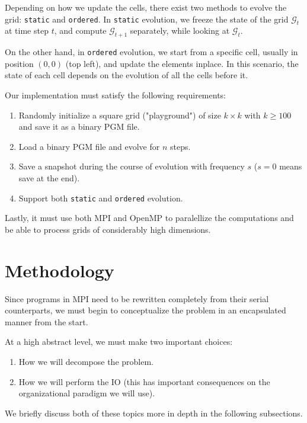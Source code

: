 \documentclass{report}
\begin{document}
Depending on how we update the cells, there exist two methods to evolve the 
grid: \texttt{static} and \texttt{ordered}. In \texttt{static} evolution, we 
freeze the state of the grid $\mathcal{G}_t$ at time step $t$, and compute 
$\mathcal{G}_{t+1}$ separately, while looking at $\mathcal{G}_t$.

On the other hand, in \texttt{ordered} evolution, we start from a specific cell, 
usually in position $(0,0)$ (top left), and update the elements in\-place. 
In this scenario, the state of each cell depends on the evolution of all the 
cells before it. 

Our implementation must satisfy the following requirements: 

\begin{enumerate}
    \item Randomly initialize a square grid ("playground") of size $k \times k$ 
        with $k \geq 100$ and save it as a binary PGM file.
    \item Load a binary PGM file and evolve for $n$ steps.
    \item Save a snapshot during the course of evolution with frequency $s$ ($s=0$ 
        means save at the end). 
    \item Support both \texttt{static} and \texttt{ordered} evolution.
\end{enumerate}

Lastly, it must use both MPI\cite{mpi} and OpenMP\cite{omp} to paralellize 
the computations and be able to process grids of considerably high dimensions. 

\section{Methodology}

Since programs in MPI need to be rewritten completely from their serial 
counterparts, we must begin to conceptualize the problem in an encapsulated 
manner from the start.

At a high abstract level, we must make two important choices: 

\begin{enumerate}
    \item How we will decompose the problem. 
    \item How we will perform the IO (this has important consequences on the 
        organizational paradigm we will use).
\end{enumerate}

We briefly discuss both of these topics more in depth in the following subsections.
\end{document}
